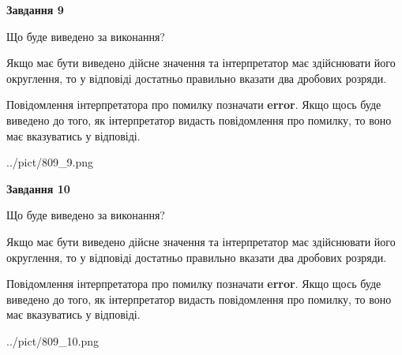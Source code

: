 \documentclass[12pt, ukrainian]{article}
\begin{document}
{\begin {Large}
{\begin {center}\textbf{Завдання 9}\end {center}}\par
Що буде виведено за виконання? \par

Якщо має бути виведено дійсне значення та інтерпретатор має здійснювати його округлення, 
то у відповіді достатньо правильно вказати два дробових розряди.

Повідомлення інтерпретатора про помилку позначати \textbf{error}.
Якщо щось буде виведено до того, як інтерпретатор видасть повідомлення про помилку, 
то воно має вказуватись у відповіді. \par

\begin{center}
	{../pict/809_9.png}
\end{center}
\newpage

{\begin {center}\textbf{Завдання 10}\end {center}}\par
Що буде виведено за виконання? \par

Якщо має бути виведено дійсне значення та інтерпретатор має здійснювати його округлення, 
то у відповіді достатньо правильно вказати два дробових розряди.

Повідомлення інтерпретатора про помилку позначати \textbf{error}.
Якщо щось буде виведено до того, як інтерпретатор видасть повідомлення про помилку, 
то воно має вказуватись у відповіді. \par

\begin{center}
	{../pict/809_10.png}
\end{center}
\newpage

\end {Large}}
\end{document}
